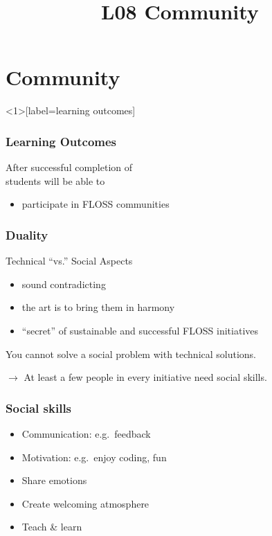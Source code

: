 

\title{L08 Community}




\section{Community}


\begin{frame}<1>[label=learning outcomes]
	\frametitle{Learning Outcomes}
	After successful completion of \inserttitle \\
	students will be able to

	\begin{itemize}
	\item participate in FLOSS communities
	\end{itemize}
\end{frame}

\begin{frame}
	\frametitle{Duality}
	Technical ``vs.'' Social Aspects

	\begin{itemize}[<+-| alert@+>]
		\item sound contradicting
		\item the art is to bring them in harmony
		\item ``secret'' of sustainable and successful FLOSS initiatives
	\end{itemize}
	\vspace{1em}
	\pause[\thebeamerpauses]  %

	You cannot solve a social problem with technical solutions.
	\vspace{1em}
	\pause

	$\rightarrow$ At least a few people in every initiative need social skills.
\end{frame}

\begin{frame}
	\frametitle{Social skills}

	\begin{itemize}[<+-| alert@+>]
		\item Communication: e.g.\ feedback
		\item Motivation: e.g.\ enjoy coding, fun
		\item Share emotions
		\item Create welcoming atmosphere
		\item Teach \& learn
	\end{itemize}
\end{frame}

